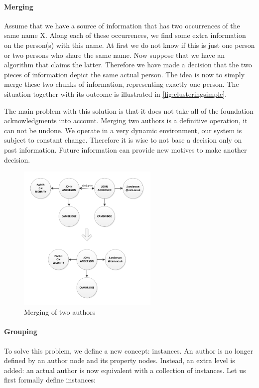 \paragraph{Merging} Assume that we have a source of information that has two occurrences of the same name X. Along each of these occurrences, we find some extra information on the person(s) with this name. At first we do not know if this is just one person or two persons who share the same name. Now suppose that we have an algorithm that claims the latter. Therefore we have made a decision that the two pieces of information depict the same actual person. The idea is now to simply merge these two chunks of information, representing exactly one person. The situation together with its outcome is illustrated in \autoref{fig:clusteringsimple}.

The main problem with this solution is that it does not take all of the foundation acknowledgments into account. Merging two authors is a definitive operation, it can not be undone. We operate in a very dynamic environment, our system is subject to constant change. Therefore it is wise to not base a decision only on past information. Future information can provide new motives to make another decision.

\begin{figure}[htb]
	\centering
		\includegraphics[width=0.6\textwidth]{fig/clusteringsimple}
	\caption{Merging of two authors}
	\label{fig:clusteringsimple}
\end{figure}

\paragraph{Grouping} To solve this problem, we define a new concept: instances. An author is no longer defined by an author node and its property nodes. Instead, an extra level is added: an actual author is now equivalent with a collection of instances. Let us first formally define instances:


